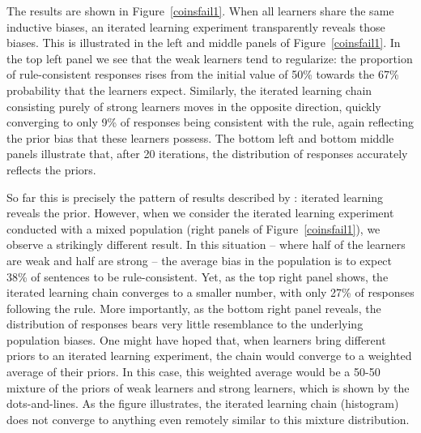 \documentclass[doc]{apa6}
\begin{document}
The results are shown in Figure~\ref{coinsfail1}. When all learners share the same inductive biases, an iterated learning experiment transparently reveals those biases. This is illustrated in the left and middle panels of Figure~\ref{coinsfail1}. In the top left panel we see that the {\sc weak} learners tend to regularize: the proportion of rule-consistent responses rises from the initial value of 50\% towards the 67\% probability that the learners expect. Similarly, the iterated learning chain consisting purely of {\sc strong} learners moves in the opposite direction, quickly converging to only 9\% of responses being consistent with the rule, again reflecting the prior bias that these learners possess. The bottom left and bottom middle panels illustrate that, after 20 iterations, the distribution of responses accurately reflects the priors. 

So far this is precisely the pattern of results described by \textcite{griffiths_language_2007}: iterated learning reveals the prior. However, when we consider the iterated learning experiment conducted with a mixed population (right panels of Figure~\ref{coinsfail1}), we observe a strikingly different result. In this situation -- where half of the learners are {\sc weak} and half are {\sc strong} -- the average bias in the population is to expect 38\% of sentences to be rule-consistent. Yet, as the top right panel shows, the iterated learning chain converges to a smaller number, with only 27\% of responses following the rule. More importantly, as the bottom right panel reveals, the distribution of responses bears very little resemblance to the underlying population biases. One might have hoped that, when learners bring different priors to an iterated learning experiment, the chain would converge to a weighted average of their priors. In this case, this weighted average would be a 50-50 mixture of the priors of {\sc weak} learners and {\sc strong} learners, which is shown by the dots-and-lines. As the figure illustrates, the iterated learning chain (histogram) does not converge to anything even remotely similar to this mixture distribution.
\end{document}
